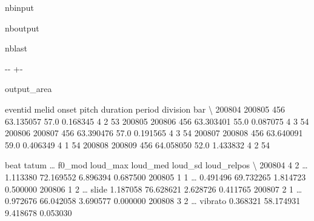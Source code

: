 \documentclass[letterpaper,10pt,english]{sphinxmanual}
\newlength\nbsphinxcodecellspacing
\begin{document}
\begin{sphinxuseclass}{nbinput}
{
\begin{sphinxVerbatim}[commandchars=\\\{\}]
\llap{\color{nbsphinxin}[16]:\,\hspace{\fboxrule}\hspace{\fboxsep}}
\end{sphinxVerbatim}
}

\end{sphinxuseclass}
\begin{sphinxuseclass}{nboutput}
\begin{sphinxuseclass}{nblast}
{

\kern-\sphinxverbatimsmallskipamount\kern-\baselineskip
\kern+\FrameHeightAdjust\kern-\fboxrule
\vspace{\nbsphinxcodecellspacing}

\begin{sphinxuseclass}{output_area}
\begin{sphinxuseclass}{}


\begin{sphinxVerbatim}[commandchars=\\\{\}]
\llap{\color{nbsphinxout}[16]:\,\hspace{\fboxrule}\hspace{\fboxsep}}        eventid  melid      onset  pitch  duration  period  division  bar  \textbackslash{}
200804   200805    456  63.135057   57.0  0.168345       4         2   53
200805   200806    456  63.303401   55.0  0.087075       4         3   54
200806   200807    456  63.390476   57.0  0.191565       4         3   54
200807   200808    456  63.640091   59.0  0.406349       4         1   54
200808   200809    456  64.058050   52.0  1.433832       4         2   54

        beat  tatum  {\ldots}   f0\_mod  loud\_max   loud\_med   loud\_sd  loud\_relpos  \textbackslash{}
200804     4      2  {\ldots}           1.113380  72.169552  6.896394     0.687500
200805     1      1  {\ldots}           0.491496  69.732265  1.814723     0.500000
200806     1      2  {\ldots}    slide  1.187058  76.628621  2.628726     0.411765
200807     2      1  {\ldots}           0.972676  66.042058  3.690577     0.000000
200808     3      2  {\ldots}  vibrato  0.368321  58.174931  9.418678     0.053030


\end{sphinxVerbatim}
\end{sphinxuseclass}
\end{sphinxuseclass}}
\end{sphinxuseclass}
\end{sphinxuseclass}
\end{document}
